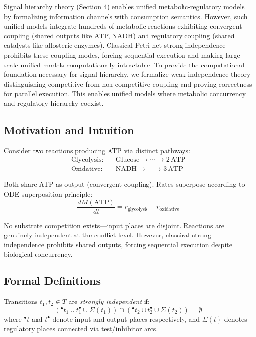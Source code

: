 
\vspace{3pt}
\noindent Signal hierarchy theory (Section 4) enables unified metabolic-regulatory models by formalizing information channels with consumption semantics. However, such unified models integrate hundreds of metabolic reactions exhibiting convergent coupling (shared outputs like ATP, NADH) and regulatory coupling (shared catalysts like allosteric enzymes). Classical Petri net strong independence prohibits these coupling modes, forcing sequential execution and making large-scale unified models computationally intractable. To provide the computational foundation necessary for signal hierarchy, we formalize weak independence theory distinguishing competitive from non-competitive coupling and proving correctness for parallel execution. This enables unified models where metabolic concurrency and regulatory hierarchy coexist.

\subsection{Motivation and Intuition}

Consider two reactions producing ATP via distinct pathways:
\begin{align*}
\text{Glycolysis:} & \quad \text{Glucose} \to \cdots \to 2\,\text{ATP} \\
\text{Oxidative:} & \quad \text{NADH} \to \cdots \to 3\,\text{ATP}
\end{align*}

Both share ATP as output (convergent coupling). Rates superpose according to ODE superposition principle:
\[
\frac{dM(\text{ATP})}{dt} = r_{\text{glycolysis}} + r_{\text{oxidative}}
\]

\vspace{3pt}
\noindent No substrate competition exists---input places are disjoint. Reactions are genuinely independent at the conflict level. However, classical strong independence prohibits shared outputs, forcing sequential execution despite biological concurrency.

\subsection{Formal Definitions}

\begin{definition}
Transitions $t_1, t_2 \in T$ are \textit{strongly independent} if:
\[
({}^\bullet t_1 \cup t_1^\bullet \cup \Sigma(t_1)) \cap ({}^\bullet t_2 \cup t_2^\bullet \cup \Sigma(t_2)) = \emptyset
\]
where ${}^\bullet t$ and $t^\bullet$ denote input and output places respectively, and $\Sigma(t)$ denotes regulatory places connected via test/inhibitor arcs.
\end{definition}

